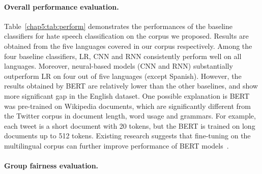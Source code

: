 \paragraph{Overall performance evaluation.}
Table~\ref{chap5:tab:perform} demonstrates the performances of the baseline classifiers for hate speech classification on the corpus we proposed. 
Results are obtained from the five languages covered in our corpus respectively.
Among the four baseline classifiers, LR, CNN and RNN consistently perform well on all languages.
Moreover, neural-based models (CNN and RNN) substantially outperform LR on four out of five languages (except Spanish).
However, the results obtained by BERT are relatively lower than the other baselines, and show more significant gap in the English dataset.
One possible explanation is BERT was pre-trained on Wikipedia documents, which are significantly different from the Twitter corpus in document length, word usage and grammars.
For example, each tweet is a short document with 20 tokens, but the BERT is trained on long documents up to 512 tokens.
Existing research suggests that fine-tuning on the multilingual corpus can further improve performance of BERT models~\cite{sun2019fine}.



\paragraph{Group fairness evaluation.}

